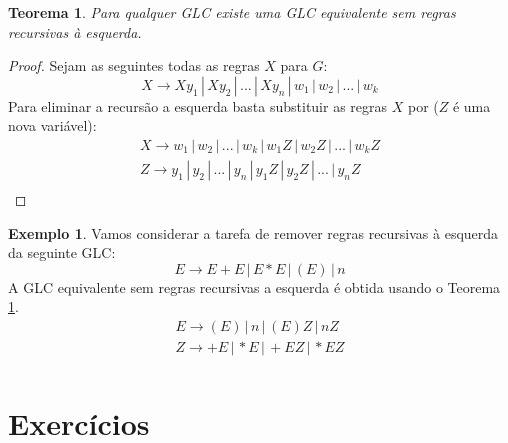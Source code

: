\documentclass[a4paper]{article}
\newtheorem{Theorem}{Teorema}
\theoremstyle{definition}
\newtheorem{Example}{Exemplo}
\begin{document}
  \begin{Theorem}\label{elimrecleft}
    Para qualquer GLC existe uma GLC equivalente sem regras recursivas à esquerda.
  \end{Theorem}
  \begin{proof}
    Sejam as seguintes todas as regras $X$ para $G$:
    \[
      X \to Xy_1\,|\,Xy_2\,|\,...\,|\,Xy_n\,|\,w_1\,|\,w_2\,|\,...\,|\,w_k
    \]
    Para eliminar a recursão a esquerda basta substituir as regras $X$ por
    ($Z$ é uma nova variável):
    \[
      \begin{array}{l}
        X \to w_1\,|\,w_2\,|\,...\,|\,w_k\,|\,w_1Z\,|\,w_2Z\,|\,...\,|\,w_kZ\\
        Z \to y_1\,|\,y_2\,|\,...\,|\,y_n\,|\,y_1Z\,|\,y_2Z\,|\,...\,|\,y_nZ\\
      \end{array}
    \]
  \end{proof}
  \begin{Example}
    Vamos considerar a tarefa de remover regras recursivas à esquerda da
    seguinte GLC:
    \[
      E \to E+E \,|\,E*E\,|\,(E)\,|\,n
    \]
    A GLC equivalente sem regras recursivas a esquerda é obtida
    usando o Teorema \ref{elimrecleft}.
    \[
      \begin{array}{l}
        E \to (E)\,|\,n \,|\,(E)Z\,|\,nZ\\
        Z \to +E \,|\,*E\,|\,+EZ \,|\,*EZ\\
      \end{array}
    \]
  \end{Example}

  
  \section{Exercícios} 
\end{document}
